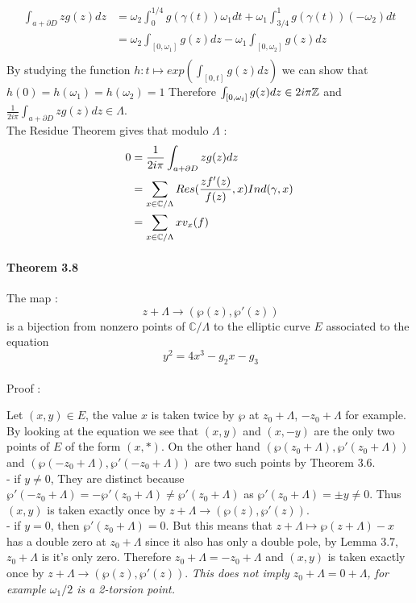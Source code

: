 \documentclass[letterpaper,10pt]{article}
\begin{document}
\begin{align*} \int_{a + \partial D} zg(z)dz &= \omega_2\int_{0}^{1/4} g(\gamma(t)) \omega_1 dt + \omega_1\int_{3/4}^{1} g(\gamma(t)) (-\omega_2) dt \\
    &= \omega_2\int_{[0,\omega_1]} g(z) dz - \omega_1\int_{[0,\omega_2]} g(z)  dz\\
\end{align*}
By studying the function $h : t \mapsto exp(\int_{[0,t]}g(z)dz)$ we can show that   $h(0) = h(\omega_1) = h(\omega_2)= 1$
Therefore $\int_{[0,\omega_i]} g(z) dz \in 2i\pi\mathbb{Z}$ and $\frac{1}{2i\pi}\int_{a + \partial D} z g(z)dz \in \Lambda$.\\
The Residue Theorem gives that modulo $\Lambda$ : \begin{align*}0 &= \frac{1}{2i\pi}\int_{a + \partial D} z g(z)dz\\
  &= \sum_{x\in \mathbb{C}/\Lambda} Res(\frac{zf'(z)}{f(z)},x) Ind(\gamma,x)\\
  &= \sum_{x\in \mathbb{C}/\Lambda}x v_x(f) \\
\end{align*}


\paragraph{Theorem 3.8} The map : \[\ z + \Lambda \to (\wp(z),\wp'(z)) \]
is a bijection from nonzero points of $\mathbb{C} / \Lambda$ to the elliptic curve $E$ associated to the equation \[\ y^2 = 4x^3 - g_2x - g_3 \]
{\itshape \paragraph{} Proof :} Let $(x,y) \in E$, the value $x$ is taken twice by $\wp$ at $z_0 + \Lambda$, $-z_0 + \Lambda$ for example.
By looking at the equation we see that $(x,y)$ and $(x,-y)$ are the only two points of $E$ of the form $(x,*)$. On the other hand $(\wp(z_0+ \Lambda),\wp'(z_0+ \Lambda))$
 and $(\wp(-z_0+ \Lambda),\wp'(-z_0+ \Lambda))$ are two such points by Theorem 3.6. \\ 
 - if $ y \neq 0$, They are distinct because $\wp'(-z_0+ \Lambda) = -\wp'(z_0+ \Lambda) \neq \wp'(z_0+ \Lambda)$ 
 as $\wp'(z_0+ \Lambda) = \pm y \neq 0.$ Thus $(x,y)$ is taken exactly once by $z + \Lambda \to (\wp(z),\wp'(z))$.\\ 
 - if $y = 0$, then $\wp'(z_0 + \Lambda) = 0$. But this means that $z+ \Lambda \mapsto \wp(z+ \Lambda) - x$ 
has a double zero at $z_0+ \Lambda$ since it also has only a double pole, by Lemma 3.7, $z_0 + \Lambda$ is it's only zero. Therefore $z_0 + \Lambda = -z_0 + \Lambda$ 
and $(x,y)$ is taken exactly once by $z + \Lambda \to (\wp(z),\wp'(z))$. {\itshape This does not imply $z_0 + \Lambda = 0 + \Lambda$, for example $\omega_1/2$ is
a 2-torsion point.}
\end{document}
